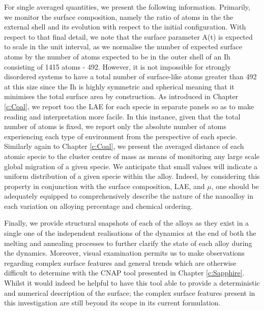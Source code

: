 For single averaged quantities, we present the following information. Primarily, we monitor the surface composition, namely the ratio of atoms in the the external shell and its evolution with respect to the initial configuration. With respect to that final detail, we note that the surface parameter A(t) is expected to scale in the unit interval, as we normalise the number of expected surface atoms by the number of atoms expected to be in the outer shell of an Ih consisting of 1415 atoms - 492. However, it is not impossible for strongly disordered systems to have a total number of surface-like atoms greater than 492 at this size since the Ih is highly symmetric and spherical meaning that it minimises the total surface area by construction. As introduced in Chapter \ref{c:Coal}, we report too the LAE for each specie in separate panels so as to make reading and interpretation more facile. In this instance, given that the total number of atoms is fixed, we report only the absolute number of atoms experiencing each type of environment from the perspective of each specie. Similarly again to Chapter \ref{c:Coal}, we present the averaged distance of each atomic specie to the cluster centre of mass as means of monitoring any large scale global migration of a given specie. We anticipate that small values will indicate a uniform distribution of a given specie within the alloy. Indeed, by considering this property in conjunction with the surface composition, LAE, and $\mu$, one should be adequately equipped to comprehensively describe the nature of the nanoalloy in each variation on alloying percentage and chemical ordering.

Finally, we provide structural snapshots of each of the alloys as they exist in a single one of the independent realisations of the dynamics at the end of both the melting and annealing processes to further clarify the state of each alloy during the dynamics. Moreover, visual examination permits us to make observations regarding complex surface features and general trends which are otherwise difficult to determine with the CNAP tool presented in Chapter \ref{c:Sapphire}. Whilst it would indeed be helpful to have this tool able to provide a deterministic and numerical description of the surface; the complex surface features present in this investigation are still beyond its scope in its current formulation.  

